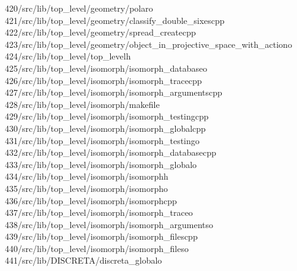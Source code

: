 \begin{tabbing}
420\>/src/lib/top\_level/geometry/polaro\\[0pt]
421\>/src/lib/top\_level/geometry/classify\_double\_sixescpp\\[0pt]
422\>/src/lib/top\_level/geometry/spread\_createcpp\\[0pt]
423\>/src/lib/top\_level/geometry/object\_in\_projective\_space\_with\_actiono\\[0pt]
424\>/src/lib/top\_level/top\_levelh\\[0pt]
425\>/src/lib/top\_level/isomorph/isomorph\_databaseo\\[0pt]
426\>/src/lib/top\_level/isomorph/isomorph\_tracecpp\\[0pt]
427\>/src/lib/top\_level/isomorph/isomorph\_argumentscpp\\[0pt]
428\>/src/lib/top\_level/isomorph/makefile\\[0pt]
429\>/src/lib/top\_level/isomorph/isomorph\_testingcpp\\[0pt]
430\>/src/lib/top\_level/isomorph/isomorph\_globalcpp\\[0pt]
431\>/src/lib/top\_level/isomorph/isomorph\_testingo\\[0pt]
432\>/src/lib/top\_level/isomorph/isomorph\_databasecpp\\[0pt]
433\>/src/lib/top\_level/isomorph/isomorph\_globalo\\[0pt]
434\>/src/lib/top\_level/isomorph/isomorphh\\[0pt]
435\>/src/lib/top\_level/isomorph/isomorpho\\[0pt]
436\>/src/lib/top\_level/isomorph/isomorphcpp\\[0pt]
437\>/src/lib/top\_level/isomorph/isomorph\_traceo\\[0pt]
438\>/src/lib/top\_level/isomorph/isomorph\_argumentso\\[0pt]
439\>/src/lib/top\_level/isomorph/isomorph\_filescpp\\[0pt]
440\>/src/lib/top\_level/isomorph/isomorph\_fileso\\[0pt]
441\>/src/lib/DISCRETA/discreta\_globalo\\[0pt]

\end{tabbing}
